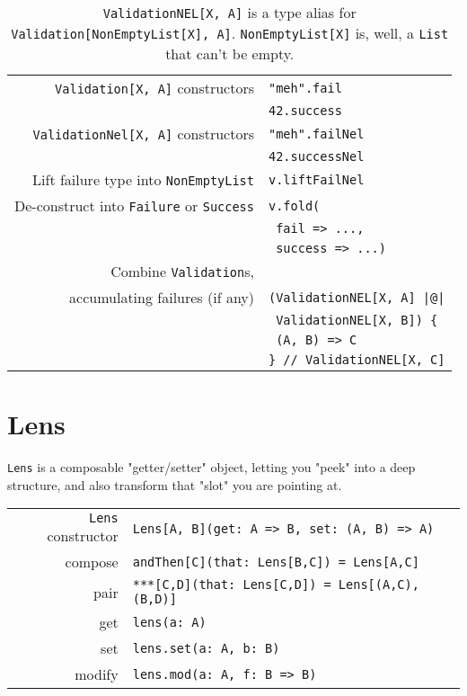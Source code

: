 \documentclass{tufte-handout}
\begin{document}
\begin{table}[ht]
  \centering
  \selectfont
  \begin{tabular}{rl}
    \toprule    
    \texttt{Validation[X, A]} constructors & \texttt{"meh".fail} \\
                                  & \texttt{42.success} \\

    \texttt{ValidationNel[X, A]} constructors & \texttt{"meh".failNel} \\
                                  & \texttt{42.successNel} \\
    Lift failure type into \texttt{NonEmptyList}  & \texttt{v.liftFailNel} \\
    \midrule
    De-construct into \texttt{Failure} or \texttt{Success} & \texttt{v.fold(} \\ & \texttt{  fail => ...,} \\ & \texttt{  success => ...)} \\
    Combine \texttt{Validation}s, \\ accumulating failures (if any) & \texttt{(ValidationNEL[X, A] |@|} \\
    & \texttt{ ValidationNEL[X, B]) \{} \\ 
    & \texttt{    (A, B) => C} \\
    & \texttt{\} // ValidationNEL[X, C]} \\
    \bottomrule
  \end{tabular}
  \caption{\newline \noindent \texttt{ValidationNEL[X, A]} is a type alias for \texttt{Validation[NonEmptyList[X], A]}. \texttt{NonEmptyList[X]} is, well, a \texttt{List} that can't be empty.}
  \label{tab:normaltab}
\end{table}

\section{Lens}\label{sec:lens}

\texttt{Lens} is a composable "getter/setter" object, letting you "peek" into a deep structure, and also transform that "slot" you are pointing at.

\begin{table}[ht]
  \centering
  \selectfont
  \begin{tabular}{rl}
    \toprule
    \texttt{Lens} constructor & \texttt{Lens[A, B](get: A => B, set: (A, B) => A)} \\
    compose & \texttt{andThen[C](that: Lens[B,C]) = Lens[A,C]} \\
    pair & \texttt{***[C,D](that: Lens[C,D]) = Lens[(A,C),(B,D)]} \\
    \midrule
    get & \texttt{lens(a: A)} \\
    set & \texttt{lens.set(a: A, b: B)} \\
    modify & \texttt{lens.mod(a: A, f: B => B)} \\
    \bottomrule
  \end{tabular}
  \label{tab:normaltab}
\end{table}
\end{document}
